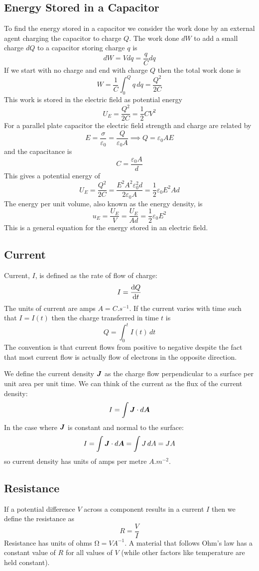 \documentclass{article}
\begin{document}
    \subsection{Energy Stored in a Capacitor}
    To find the energy stored in a capacitor we consider the work done by an external agent charging the capacitor to charge \(Q\).
    The work done \(dW\) to add a small charge \(dQ\) to a capacitor storing charge \(q\) is
    \[dW = Vdq = \frac{q}{C}dq\]
    If we start with no charge and end with charge \(Q\) then the total work done is
    \[W = \frac{1}{C}\int_0^Q q\,dq = \frac{Q^2}{2C}\]
    This work is stored in the electric field as potential energy
    \[U_E = \frac{Q^2}{2C} = \frac{1}{2}CV^2\]
    For a parallel plate capacitor the electric field strength and charge are related by
    \[E = \frac{\sigma}{\varepsilon_0} = \frac{Q}{\varepsilon_0 A} \implies Q = \varepsilon_0AE\]
    and the capacitance is
    \[C = \frac{\varepsilon_0 A}{d}\]
    This gives a potential energy of
    \[U_E = \frac{Q^2}{2C} = \frac{E^2A^2\varepsilon_0^2d}{2\varepsilon_0 A} = \frac{1}{2}\varepsilon_0 E^2Ad\]
    The energy per unit volume, also known as the energy density, is
    \[u_E = \frac{U_E}{V} = \frac{U_E}{Ad} = \frac{1}{2}\varepsilon_0E^2\]
    This is a general equation for the energy stored in an electric field.
    
    \subsection{Current}
    Current, \(I\), is defined as the rate of flow of charge:
    \[I = \dv{Q}{t}\]
    The units of current are amps \(\si{A} = \si{C.s^{-1}}\).
    If the current varies with time such that \(I = I(t)\) then the charge transferred in time \(t\) is
    \[Q = \int_0^t I(t)\,dt\]
    The convention is that current flows from positive to negative despite the fact that most current flow is actually flow of electrons in the opposite direction.
    
    We define the current density \(\bm{J}\) as the charge flow perpendicular to a surface per unit area per unit time.
    We can think of the current as the flux of the current density:
    \[I = \int \bm{J}\cdot d\bm{A}\]
    In the case where \(\bm{J}\) is constant and normal to the surface:
    \[I = \int\bm{J}\cdot d\bm{A} = \int J\,dA = JA\]
    so current density has units of amps per metre \(\si{A.m^{-2}}\).
    
    \subsection{Resistance}
    If a potential difference \(V\) across a component results in a current \(I\) then we define the resistance as
    \[R = \frac{V}{I}\]
    Resistance has units of ohms \(\si{\ohm} = \si{VA^{-1}}\).
    A material that follows Ohm's law has a constant value of \(R\) for all values of \(V\) (while other factors like temperature are held constant).
    
\end{document}
